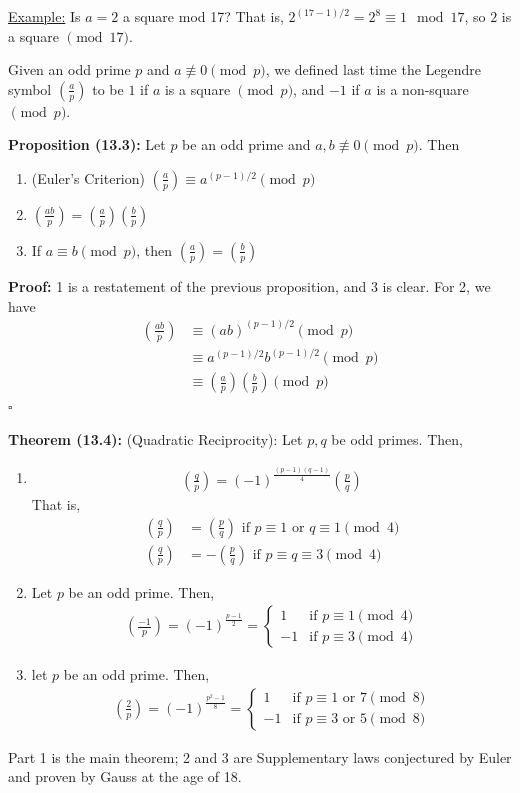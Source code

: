 \documentclass{article}
\newcommand*{\qed}{\hfill$\square$}%
\begin{document}
\underline{Example:} Is $a=2$ a square mod 17? That is, $2^{(17-1)/2}=2^8\equiv 1\mod{17}$, so $2$ is a square $\pmod{17}$.

Given an odd prime $p$ and $a\not\equiv 0\pmod p$, we defined last time the Legendre symbol $(\frac{a}{p})$ to be $1$ if $a$ is a square $\pmod p$, and $-1$ if $a$ is a non-square $\pmod p$.

\textbf{Proposition (13.3):} Let $p$ be an odd prime and $a,b\not\equiv 0\pmod p$. Then \begin{enumerate}
    \item (Euler's Criterion) $(\frac{a}{p})\equiv a^{(p-1)/2}\pmod p$
    \item $(\frac{ab}{p})=(\frac{a}{p})(\frac{b}{p})$
    \item If $a\equiv b\pmod p$, then $(\frac{a}{p})=(\frac{b}{p})$
\end{enumerate}

\textbf{Proof:} 1 is a restatement of the previous proposition, and 3 is clear. For 2, we have \begin{align*}
    (\frac{ab}{p})&\equiv (ab)^{(p-1)/2}\pmod p\\
    &\equiv a^{(p-1)/2}b^{(p-1)/2}\pmod p\\
    &\equiv (\frac{a}{p})(\frac{b}{p})\pmod p
\end{align*} \qed

\textbf{Theorem (13.4):} (Quadratic Reciprocity): Let $p,q$ be odd primes. Then, \begin{enumerate}
    \item \begin{align*}
        (\frac{q}{p})=(-1)^{\frac{(p-1)(q-1)}{4}}(\frac{p}{q})
    \end{align*}That is, \begin{align*}
        (\frac{q}{p})&=(\frac{p}{q})\text{ if }p\equiv 1\text{ or }q\equiv 1\pmod 4\\
        (\frac{q}{p})&=-(\frac{p}{q})\text{ if }p\equiv q\equiv 3\pmod 4
    \end{align*}
    \item Let $p$ be an odd prime. Then, \begin{align*}
        (\frac{-1}{p})=(-1)^{\frac{p-1}{2}}=\begin{cases}
            1 & \text{if }p\equiv 1\pmod 4\\
            -1 & \text{if }p\equiv 3\pmod 4
        \end{cases}
    \end{align*}
    \item let $p$ be an odd prime. Then, \begin{align*}
        (\frac{2}{p})=(-1)^{\frac{p^2-1}{8}}=\begin{cases}
            1 & \text{if }p\equiv 1\text{ or }7\pmod 8\\
            -1 & \text{if }p\equiv 3\text{ or }5\pmod 8
        \end{cases}
    \end{align*}
\end{enumerate}Part 1 is the main theorem; 2 and 3 are Supplementary laws conjectured by Euler and proven by Gauss at the age of 18.
\end{document}
